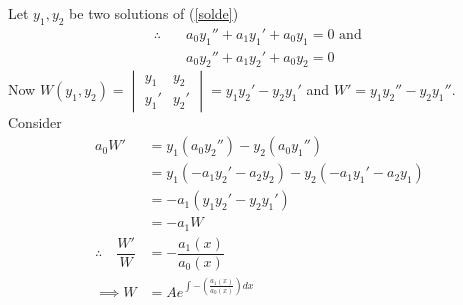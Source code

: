 \documentclass[a4paper, titlepage]{article}
\begin{document}
        \noindent Let $y_1, y_2$ be two solutions of (\ref{solde})
        \begin{align}
            \therefore \quad & a_0y_1'' + a_1y_1' + a_0y_1 = 0 \text{ and } \\
            & a_0y_2'' + a_1y_2' + a_0y_2 = 0
        \end{align}
        Now $
                W(y_1, y_2) =
                                \begin{vmatrix}
                                    y_1 & y_2 \\
                                    y_1' & y_2'
                                \end{vmatrix}
                            = y_1y_2' - y_2y_1'
            $ and $W' = y_1y_2'' - y_2y_1''$.
        Consider 
        \begin{align*}
            a_0W' &= y_1(a_0y_2'') - y_2(a_0y_1'') \\
                  &= y_1(-a_1y_2' - a_2y_2) - y_2(-a_1y_1' - a_2y_1) \\
                  &= -a_1(y_1y_2' - y_2y_1') \\
                  &= -a_1W \\
            \therefore \quad \dfrac{W'}{W} &= -\dfrac{a_1(x)}{a_0(x)} \\
            \implies W &= Ae^{\int -\left( \frac{a_1(x)}{a_0(x)} \right)dx }
        \end{align*}
\end{document}
